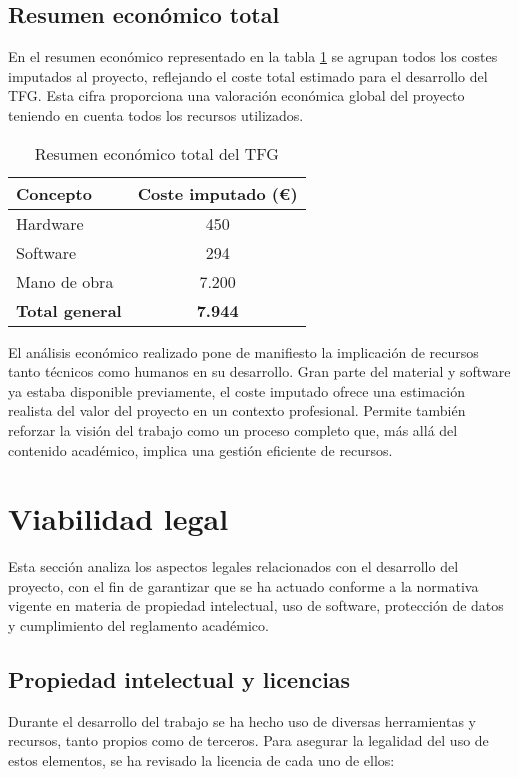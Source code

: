 \subsection{Resumen económico total}
En el resumen económico representado en la tabla \ref{total} se agrupan todos los costes imputados al proyecto, reflejando el coste total estimado para el desarrollo del TFG. Esta cifra proporciona una valoración económica global del proyecto teniendo en cuenta todos los recursos utilizados.
\begin{table}[h]
\centering
\begin{tabular}{|l|c|}
\hline
\textbf{Concepto} & \textbf{Coste imputado (€)} \\
\hline
Hardware & 450 \\
Software & 294 \\
Mano de obra & 7.200 \\
\hline
\textbf{Total general} & \textbf{7.944} \\
\hline
\end{tabular}
\caption{Resumen económico total del TFG}
\label{total}
\end{table}

El análisis económico realizado pone de manifiesto la implicación de recursos tanto técnicos como humanos en su desarrollo. Gran parte del material y software ya estaba disponible previamente, el coste imputado ofrece una estimación realista del valor del proyecto en un contexto profesional. Permite también reforzar la visión del trabajo como un proceso completo que, más allá del contenido académico, implica una gestión eficiente de recursos.

\section{Viabilidad legal}

Esta sección analiza los aspectos legales relacionados con el desarrollo del proyecto, con el fin de garantizar que se ha actuado conforme a la normativa vigente en materia de propiedad intelectual, uso de software, protección de datos y cumplimiento del reglamento académico.

\subsection{Propiedad intelectual y licencias}

Durante el desarrollo del trabajo se ha hecho uso de diversas herramientas y recursos, tanto propios como de terceros. Para asegurar la legalidad del uso de estos elementos, se ha revisado la licencia de cada uno de ellos:

